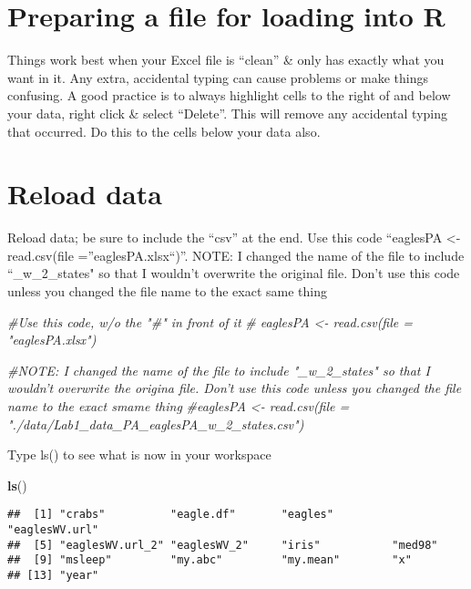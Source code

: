 \documentclass[]{book}
\newenvironment{Shaded}{\begin{snugshade}}{\end{snugshade}}
\newcommand{\KeywordTok}[1]{\textcolor[rgb]{0.13,0.29,0.53}{\textbf{#1}}}
\newcommand{\CommentTok}[1]{\textcolor[rgb]{0.56,0.35,0.01}{\textit{#1}}}
\newcommand{\NormalTok}[1]{#1}
\theoremstyle{definition}
\theoremstyle{definition}
\theoremstyle{definition}
\theoremstyle{remark}
\begin{document}
\section{Preparing a file for loading into
R}\label{preparing-a-file-for-loading-into-r}

Things work best when your Excel file is ``clean'' \& only has exactly
what you want in it. Any extra, accidental typing can cause problems or
make things confusing. A good practice is to always highlight cells to
the right of and below your data, right click \& select ``Delete''. This
will remove any accidental typing that occurred. Do this to the cells
below your data also.

\section{Reload data}\label{reload-data}

Reload data; be sure to include the ``csv'' at the end. Use this code
``eaglesPA \textless{}- read.csv(file =''eaglesPA.xlsx``)''. NOTE: I
changed the name of the file to include ``\_w\_2\_states" so that I
wouldn't overwrite the original file. Don't use this code unless you
changed the file name to the exact same thing

\begin{Shaded}
\begin{Highlighting}[]
\CommentTok{#Use this code, w/o the "#" in front of it}
\CommentTok{# eaglesPA <- read.csv(file = "eaglesPA.xlsx")}

\CommentTok{#NOTE: I changed the name of the file to include "_w_2_states" so that I wouldn't overwrite the origina file.  Don't use this code unless you changed the file name to the exact smame thing}
\CommentTok{#eaglesPA <- read.csv(file = "./data/Lab1_data_PA_eaglesPA_w_2_states.csv")}
\end{Highlighting}
\end{Shaded}

Type ls() to see what is now in your workspace

\begin{Shaded}
\begin{Highlighting}[]
\KeywordTok{ls}\NormalTok{()}
\end{Highlighting}
\end{Shaded}

\begin{verbatim}
##  [1] "crabs"          "eagle.df"       "eagles"         "eaglesWV.url"  
##  [5] "eaglesWV.url_2" "eaglesWV_2"     "iris"           "med98"         
##  [9] "msleep"         "my.abc"         "my.mean"        "x"             
## [13] "year"
\end{verbatim}
\end{document}
